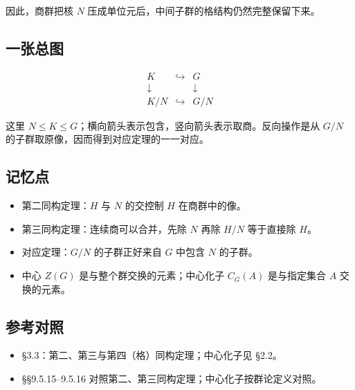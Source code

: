 因此，商群把核 $N$ 压成单位元后，中间子群的格结构仍然完整保留下来。

\subsection{一张总图}


\[
\begin{array}{ccc}
K & \hookrightarrow & G\\[4pt]
\downarrow & & \downarrow\\[4pt]
K/N & \hookrightarrow & G/N
\end{array}
\]

这里 $N\le K\le G$；横向箭头表示包含，竖向箭头表示取商。反向操作是从 $G/N$ 的子群取原像，因而得到对应定理的一一对应。

\subsection{记忆点}


\begin{itemize}
\item 第二同构定理：$H$ 与 $N$ 的交控制 $H$ 在商群中的像。
\item 第三同构定理：连续商可以合并，先除 $N$ 再除 $H/N$ 等于直接除 $H$。
\item 对应定理：$G/N$ 的子群正好来自 $G$ 中包含 $N$ 的子群。
\item 中心 $Z(G)$ 是与整个群交换的元素；中心化子 $C_G(A)$ 是与指定集合 $A$ 交换的元素。
\end{itemize}


\subsection{参考对照}


\begin{itemize}
\item [DF] §3.3：第二、第三与第四（格）同构定理；中心化子见 §2.2。
\item [DS] §§9.5.15–9.5.16 对照第二、第三同构定理；中心化子按群论定义对照。
\end{itemize}
